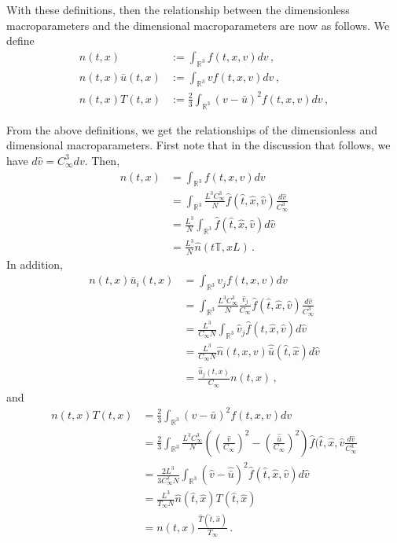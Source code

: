 \documentclass[12pt]{CSUNthesis}
\def\T{\mathbb{T}}
\def\R{\mathbb{R}}
\newcommand{\Tref}{T_{\infty}}
\newcommand{\Cref}{C_{\infty}}
\def\T{\mathbb{T}}
\def\R{\mathbb{R}}
\begin{document}
With these definitions, then the relationship between the dimensionless macroparameters and the dimensional macroparameters are now as follows. We define
\begin{equation}
\begin{split}
\label{eq:dimless_macro}
n(t,x)&:=\int_{\R^3} f(t,x,v)  dv\, ,  \\
n(t,x)\bar{u}(t,x)&:=\int_{\R^3} vf(t,x,v) dv\,  ,  \\
n(t,x)T(t,x)&:=\frac{2}{3} \int_{\R^3} (v - \bar{u})^2 f(t,x,v) dv\, , 
\end{split}
\end{equation}

From the above definitions, we get the relationships of the dimensionless and dimensional macroparameters. First note that in the discussion that follows, we have $d\hat{v} = C_{\infty}^3 dv$. Then,
\begin{equation}
\begin{split}
n(t,x) &= \int_{\R^3} f(t,x,v)  dv\, \\
&= \int_{\R^3} \frac{L^3 \Cref^3}{N} \hat{f}(\hat{t},\hat{x},\hat{v})\frac{d\hat{v}}{\Cref^3} \\
&= \frac{L^3}{N}  \int_{\R^3}  \hat{f}(\hat{t},\hat{x},\hat{v}) d\hat{v}\\
&= \frac{L^3}{N} \hat{n}(t\T,xL)\, .
\end{split}
\end{equation}
In addition,
\begin{equation}
\begin{split}
n(t,x) \bar{u}_i(t,x) &= \int_{\R^3} v_j f(t,x,v)  dv\, \\
&= \int_{\R^3} \frac{L^3 \Cref^3}{N} \frac{\hat{v}_j}{\Cref} \hat{f}(\hat{t},\hat{x},\hat{v})\frac{d\hat{v}}{\Cref^3} \\
&= \frac{L^3}{\Cref N}  \int_{\R^3} \hat{v}_j  \hat{f}(\hat{t},\hat{x},\hat{v}) d\hat{v}\\
&= \frac{L^3}{\Cref N} \hat{n}(t,x,v) \hat{\bar{u}}(\hat{t},\hat{x}) d\hat{v} \\
&= \frac{\hat{\bar{u}}_j(t,x)}{\Cref}n(t,x)\, ,
\end{split}
\end{equation}
and
\begin{equation}
\begin{split}
n(t,x)T(t,x) &= \frac{2}{3} \int_{\R^3}(v-\bar{u})^2 f(t,x,v)dv \\
&= \frac{2}{3} \int_{\R^3} \frac{L^3 \Cref^3}{N} \left( \left( \frac{\hat{v}}{\Cref} \right)^2 - \left( \frac{\hat{\bar{u}}}{\Cref} \right)^2 \right)\hat{f}(\hat{t},\hat{x},\hat{v} \frac{d\hat{v}}{\Cref^3} \\
&= \frac{2L^3}{3 \Cref^2 N} \int_{\R^3} (\hat{v} - \hat{\bar{u}})^2\hat{f}(\hat{t},\hat{x},\hat{v}) d\hat{v} \\
&= \frac{L^3}{\Tref N }\hat{n}(\hat{t},\hat{x}) T(\hat{t},\hat{x}) \\ 
&= n(t,x) \frac{\hat{T}(\hat{t},\hat{x})}{\Tref} \, .\\
\end{split}
\end{equation}
\end{document}
